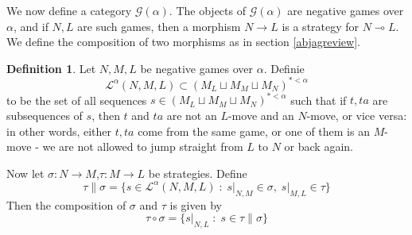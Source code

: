 \documentclass[11pt]{article} %
\theoremstyle{plain} %
\theoremstyle{definition} %
\newtheorem{definition}[theorem]{Definition}
\theoremstyle{exercisestyle}
\newcommand*\from{\colon}
\newcommand{\cmap}[3]{#1\from{}#2\to{}#3}
\renewcommand{\implies}{\multimap}
\newcommand{\comp}[2]{#1 \circ #2}
\newcommand{\cprd}{\sqcup}
\newcommand{\G}{\mathcal G}
\newcommand{\suchthat}{\;\colon\;}
\renewcommand{\L}{\mathcal L}
\begin{document}
We now define a category $\G(\alpha)$.  The objects of $\G(\alpha)$ are negative games over $\alpha$, and if $N,L$ are such games, then a morphism $N\to L$ is a strategy for $N\implies L$.  We define the composition of two morphisms as in section \ref{abjagreview}.

\begin{definition}
  Let $N,M,L$ be negative games over $\alpha$.  Definie
  \[
    \L^\alpha(N,M,L)\subset(M_L\cprd M_M\cprd M_N)^{*<\alpha}
  \]
  to be the set of all sequences $s\in(M_L\cprd M_M\cprd M_N)^{*<\alpha}$ such that if $t,ta$ are subsequences of $s$, then $t$ and $ta$ are not an $L$-move and an $N$-move, or vice versa: in other words, either $t,ta$ come from the same game, or one of them is an $M$-move - we are not allowed to jump straight from $L$ to $N$ or back again.
  
  Now let $\cmap{\sigma}{N}{M}$,$\cmap{\tau}{M}{L}$ be strategies.  Define
  \[
    \tau\|\sigma = \{s\in\L^\alpha(N,M,L)\suchthat s\vert_{N,M}\in \sigma,\; s\vert_{M,L}\in\tau\}
  \]
  Then the composition of $\sigma$ and $\tau$ is given by
  \[
    \comp\tau\sigma=\{s\vert_{N,L}\suchthat s\in\tau\|\sigma\}
  \]
\end{definition}
\end{document}
